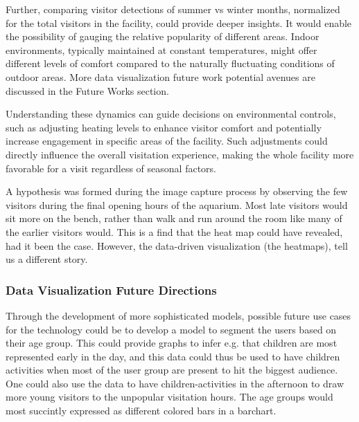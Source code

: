 Further, comparing visitor detections of summer vs winter months, normalized for the total visitors in the facility, could provide deeper insights. It would enable the possibility of gauging the relative popularity of different areas. Indoor environments, typically maintained at constant temperatures, might offer different levels of comfort compared to the naturally fluctuating conditions of outdoor areas. More data visualization future work potential avenues are discussed in the Future Works section. 

Understanding these dynamics can guide decisions on environmental controls, such as adjusting heating levels to enhance visitor comfort and potentially increase engagement in specific areas of the facility. Such adjustments could directly influence the overall visitation experience, making the whole facility more favorable for a visit regardless of seasonal factors.

A hypothesis was formed during the image capture process by observing the few visitors during the final opening hours of the aquarium. Most late visitors would sit more on the bench, rather than walk and run around the room like many of the earlier visitors would. This is a find that the heat map could have revealed, had it been the case. However, the data-driven visualization (the heatmaps), tell us a different story. 

\subsubsection{Data Visualization Future Directions}
Through the development of more sophisticated models, possible future use cases for the technology could be to develop a model to segment the users based on their age group. This could provide graphs to infer e.g. that children are most represented early in the day, and this data could thus be used to have children activities when most of the user group are present to hit the biggest audience. One could also use the data to have children-activities in the afternoon to draw more young visitors to the unpopular visitation hours. The age groups would most succintly expressed as different colored bars in a barchart.  